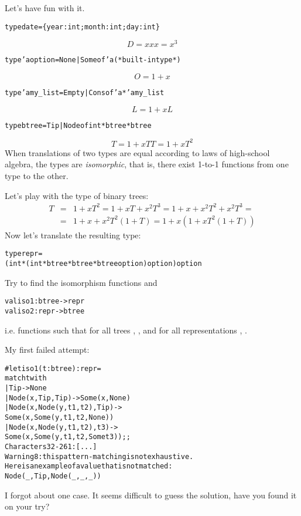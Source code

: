 \documentclass{article}
\newcommand{\tmem}[1]{{\em #1\/}}
\newcommand{\tmverbatim}[1]{\text{{\ttfamily{#1}}}}
\newenvironment{tmcode}[1][]{\begin{alltt} }{\end{alltt}}
\begin{document}
Let's have fun with it.{\newpage}
\begin{tmcode}
type date = \{year: int; month: int; day: int\}
\end{tmcode}
\[ D = xxx = x^3 \]
\begin{tmcode}
type 'a option = None | Some of 'a   (* built-in type *)
\end{tmcode}
\[ O = 1 + x \]
\begin{tmcode}
type 'a my_list = Empty | Cons of 'a * 'a my_list
\end{tmcode}
\[ L = 1 + xL \]
\begin{tmcode}
type btree = Tip | Node of int * btree * btree
\end{tmcode}
\[ T = 1 + xTT = 1 + xT^2 \]
When translations of two types are equal according to laws of high-school
algebra, the types are {\tmem{isomorphic}}, that is, there exist 1-to-1
functions from one type to the other.{\newpage}

Let's play with the type of binary trees:
\begin{eqnarray*}
  T & = & 1 + xT^2 = 1 + xT + x^2 T^3 = 1 + x + x^2 T^2 + x^2 T^3 =\\
  & = & 1 + x + x^2 T^2  (1 + T) = 1 + x (1 + xT^2  (1 + T))
\end{eqnarray*}
Now let's translate the resulting type:
\begin{tmcode}
type repr =
  (int * (int * btree * btree * btree option) option) option
\end{tmcode}
Try to find the isomorphism functions \tmverbatim{iso1} and \tmverbatim{iso2}
\begin{tmcode}
val iso1 : btree -> repr
val iso2 : repr -> btree
\end{tmcode}
i.e. functions such that for all trees \tmverbatim{t}, \tmverbatim{iso2 (iso1
t) = t}, and for all representations \tmverbatim{r}, \tmverbatim{iso1 (iso2 r)
= r}.

My first failed attempt:
\begin{tmcode}
\# let iso1 (t : btree) : repr =
  match t with
    | Tip -> None
    | Node (x, Tip, Tip) -> Some (x, None)
    | Node (x, Node (y, t1, t2), Tip) ->
      Some (x, Some (y, t1, t2, None))
    | Node (x, Node (y, t1, t2), t3) ->
      Some (x, Some (y, t1, t2, Some t3));;
            Characters 32-261: [...]
Warning 8: this pattern-matching is not exhaustive.
Here is an example of a value that is not matched:
Node (_, Tip, Node (_, _, _))
\end{tmcode}
I forgot about one case. It seems difficult to guess the solution, have you
found it on your try?{\newpage}
\end{document}
